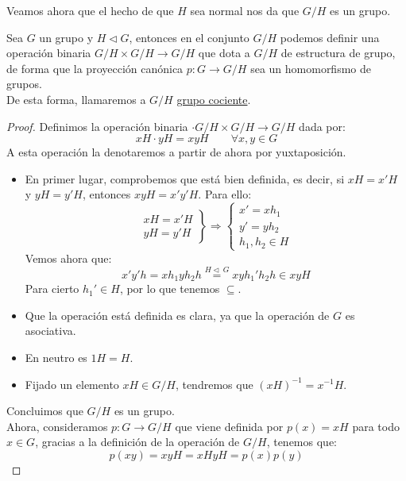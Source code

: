 Veamos ahora que el hecho de que $H$ sea normal nos da que $G/H$ es un grupo.

\begin{teo}
    Sea $G$ un grupo y $H\lhd G$, entonces en el conjunto $G/H$ podemos definir una operación binaria $G/H\times G/H\longrightarrow G/H$ que dota a $G/H$ de estructura de grupo, de forma que la proyección canónica $p:G\to G/H$ sea un homomorfismo de grupos.\\

    \noindent
    De esta forma, llamaremos a $G/H$ \underline{grupo cociente}.
    \begin{proof}
        Definimos la operación binaria $\cdot G/H\times G/H\longrightarrow G/H$ dada por:
        \begin{equation*}
            xH\cdot yH = xyH \qquad \forall x,y\in G
        \end{equation*}
        A esta operación la denotaremos a partir de ahora por yuxtaposición.
        \begin{itemize}
            \item En primer lugar, comprobemos que está bien definida, es decir, si $xH = x'H$ y $yH=y'H$, entonces $xyH = x'y'H$. Para ello:
                \begin{equation*}
                    \left.\begin{array}{l}
                        xH = x'H \\
                        yH = y'H
                    \end{array}\right\} \Longrightarrow \left\{\begin{array}{l}
                        x'= xh_1 \\
                        y' = yh_2 \\
                        h_1,h_2\in H
                    \end{array}\right.
                \end{equation*}
                Vemos ahora que:
                \begin{equation*}
                    x'y'h = xh_1yh_2h \stackrel{H\lhd\ G}{=} xyh_1'h_2h \in xyH
                \end{equation*}
                Para cierto $h_1'\in H$, por lo que tenemos $\subseteq$.
            \item Que la operación está definida es clara, ya que la operación de $G$ es asociativa.
            \item En neutro es $1H = H$.
            \item Fijado un elemento $xH \in G/H$, tendremos que ${(xH)}^{-1} = x^{-1}H$.
        \end{itemize}
        Concluimos que $G/H$ es un grupo.\\

        \noindent
        Ahora, consideramos $p:G\rightarrow G/H$ que viene definida por $p(x) = xH$ para todo $x\in G$, gracias a la definición de la operación de $G/H$, tenemos que:
        \begin{equation*}
            p(xy) = xyH = xHyH = p(x)p(y)
        \end{equation*}
    \end{proof}
\end{teo}

